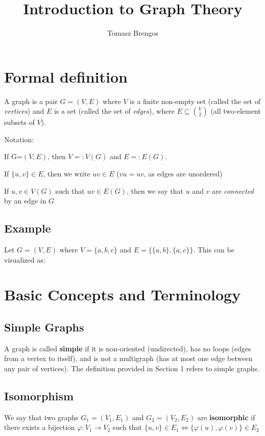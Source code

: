 \documentclass[docmute]{article}
\title{Introduction to Graph Theory}
\author{Tomasz Brengos}
\date{}
\begin{document}
\maketitle


\section{Formal definition}
A graph is a pair \(G=(V,E)\) where \(V\) is a finite non-empty set (called the set of  \emph{vertices}) 
and \(E\) is a set (called the set of \emph{edges}), where \(E \subseteq \binom{V}{2}\) (all two-element subsets of \(V\)).
\medskip

Notation:\medskip

If G=\((V,E)\), then  \(V =: V(G)\) and \(E =: E(G)\).
\medskip

If \(\{u,v\} \in E\), then we write \(uv \in E\) (\(vu=uv\), as edges are unordered)
\medskip

If \(u,v \in V(G)\) such that \(uv \in E(G)\), then we say that \(u\) and \(v\) are \emph{connected} by an edge in \(G\)
\medskip

\subsection*{Example}
Let \(G = (V,E)\) where \(V = \{a,b,c\}\) and \(E = \{\{a,b\}, \{a,c\}\}\).
This can be visualized as:
\begin{center}
\end{center}

\section{Basic Concepts and Terminology}

\subsection*{Simple Graphs}
A graph is called \textbf{simple} if it is non-oriented (undirected), has no loops (edges from a vertex to itself), and is not a multigraph (has at most one edge between any pair of vertices). The definition provided in Section 1 refers to simple graphs.

\subsection*{Isomorphism}
We say that two graphs \(G_1 = (V_1, E_1)\) and \(G_2 = (V_2, E_2)\) are \textbf{isomorphic} 
if there exists a bijection \(\varphi: V_1 \to V_2\) such that 
\( \{u,v\} \in E_1 \iff \{\varphi(u),\varphi(v)\} \in E_2  \)
\end{document}
